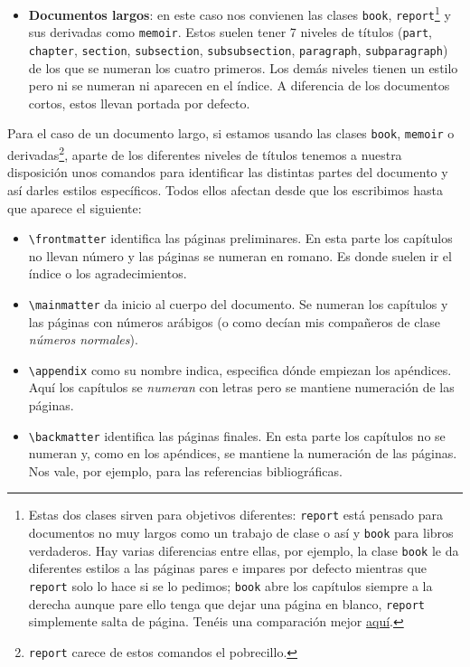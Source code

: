 \begin{itemize}
\item
  \textbf{Documentos largos}: en este caso nos convienen las clases
  \lstinline!book!, \lstinline!report!\footnote{Estas dos clases sirven
    para objetivos diferentes: \lstinline!report! está pensado para
    documentos no muy largos como un trabajo de clase o así y
    \lstinline!book! para libros verdaderos. Hay varias diferencias
    entre ellas, por ejemplo, la clase \lstinline!book! le da diferentes
    estilos a las páginas pares e impares por defecto mientras que
    \lstinline!report! solo lo hace si se lo pedimos; \lstinline!book!
    abre los capítulos siempre a la derecha aunque pare ello tenga que
    dejar una página en blanco, \lstinline!report! simplemente salta de
    página. Tenéis una comparación mejor
    \href{http://tex.stackexchange.com/questions/36988/ddg\#36989}{aquí}.}
  y sus derivadas como \lstinline!memoir!. Estos suelen tener 7 niveles
  de títulos (\lstinline!part!, \lstinline!chapter!,
  \lstinline!section!, \lstinline!subsection!,
  \lstinline!subsubsection!, \lstinline!paragraph!,
  \lstinline!subparagraph!) de los que se numeran los cuatro primeros.
  Los demás niveles tienen un estilo pero ni se numeran ni aparecen en
  el índice. A diferencia de los documentos cortos, estos llevan portada
  por defecto.
\end{itemize}

Para el caso de un documento largo, si estamos usando las clases
\lstinline!book!, \lstinline!memoir! o derivadas\footnote{\lstinline!report!
  carece de estos comandos el pobrecillo.}, aparte de los diferentes
niveles de títulos tenemos a nuestra disposición unos comandos para
identificar las distintas partes del documento y así darles estilos
específicos. Todos ellos afectan desde que los escribimos hasta que
aparece el siguiente:

\begin{itemize}
\item
  \lstinline!\frontmatter! identifica las páginas preliminares. En esta
  parte los capítulos no llevan número y las páginas se numeran en
  romano. Es donde suelen ir el índice o los agradecimientos.
\item
  \lstinline!\mainmatter! da inicio al cuerpo del documento. Se numeran
  los capítulos y las páginas con números arábigos (o como decían mis
  compañeros de clase \emph{números normales}).
\item
  \lstinline!\appendix! como su nombre indica, especifica dónde empiezan
  los apéndices. Aquí los capítulos se \emph{numeran} con letras pero se
  mantiene numeración de las páginas.
\item
  \lstinline!\backmatter! identifica las páginas finales. En esta parte
  los capítulos no se numeran y, como en los apéndices, se mantiene la
  numeración de las páginas. Nos vale, por ejemplo, para las referencias
  bibliográficas.
\end{itemize}

